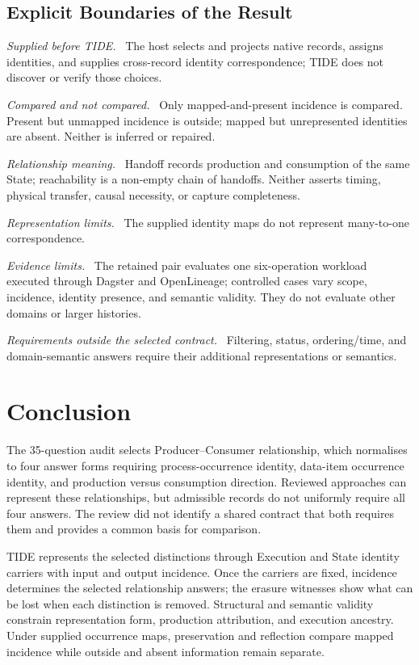 \documentclass[conference]{IEEEtran}
\theoremstyle{tideproposition}
\newcommand{\reviewitem}[1]{\par\addvspace{0.22\baselineskip}\noindent\emph{#1.}\ }
\begin{document}
\subsection{Explicit Boundaries of the Result}

\reviewitem{Supplied before TIDE}
The host selects and projects native records, assigns identities,
and supplies cross-record identity correspondence; TIDE does not discover or verify those choices.

\reviewitem{Compared and not compared}
Only mapped-and-present incidence is compared. Present but unmapped incidence
is outside; mapped but unrepresented identities are absent. Neither is inferred
or repaired.

\reviewitem{Relationship meaning}
Handoff records production and consumption of the same State; reachability is a non-empty chain of handoffs. Neither asserts timing, physical transfer, causal necessity, or capture completeness.

\reviewitem{Representation limits}
The supplied identity maps do not represent many-to-one correspondence.

\reviewitem{Evidence limits}
The retained pair evaluates one six-operation workload executed through Dagster and OpenLineage; controlled cases vary scope, incidence, identity presence, and semantic validity. They do not evaluate other domains or larger histories.

\reviewitem{Requirements outside the selected contract}
Filtering, status, ordering/time, and domain-semantic answers require their
additional representations or semantics.

\section{Conclusion}
The 35-question audit selects Producer--Consumer relationship, which normalises to four answer forms requiring process-occurrence identity, data-item occurrence identity, and production versus consumption direction. Reviewed approaches can represent these relationships, but admissible records do not uniformly require all four answers. The review did not identify a shared contract that both requires them and provides a common basis for comparison.

TIDE represents the selected distinctions through Execution and State identity carriers with input and output incidence. Once the carriers are fixed, incidence determines the selected relationship answers; the erasure witnesses show what can be lost when each distinction is removed. Structural and semantic validity constrain representation form, production attribution, and execution ancestry. Under supplied occurrence maps, preservation and reflection compare mapped incidence while outside and absent information remain separate.
\end{document}
